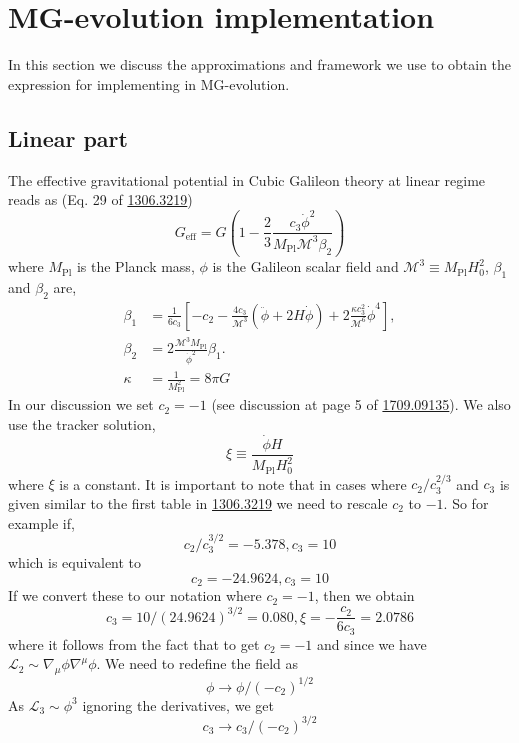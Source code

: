 \documentclass{article}
\def\be{\begin{equation}}
\def\ee{\end{equation}}
\begin{document}
\section{MG-evolution implementation}
In this section we discuss the approximations and framework we use to obtain the expression for implementing in MG-evolution.
\subsection{Linear part}
The effective gravitational potential in Cubic Galileon theory at linear regime reads as (Eq. 29 of \href{https://arxiv.org/abs/1306.3219}{1306.3219})
\be
G_{\mathrm{eff}}=G\left(1-\frac{2}{3} \frac{c_3 \dot{\phi}^2}{M_{\mathrm{Pl}} \mathcal{M}^3 \beta_2}\right)
\ee
where $M_{\mathrm{Pl}}$ is the Planck mass, $\phi$ is the Galileon scalar field and $\mathcal{M}^3 \equiv M_{\mathrm{Pl}} H_0^2$, $\beta_1$ and $\beta_2$ are,
\begin{align*}
\beta_1 &= \frac{1}{6 c_3}\left[-c_2 - \frac{4 c_3}{\mathcal{M}^3}(\ddot{\phi}+2 H \dot{\phi}) + 2 \frac{\kappa c_3^2}{\mathcal{M}^6} \dot{\phi}^4\right], \\
\beta_2 &= 2 \frac{\mathcal{M}^3 M_{\mathrm{Pl}}}{\dot{\phi}^2} \beta_1. \\
\kappa &= \frac{1}{M_{\mathrm{Pl}}^2} = 8 \pi G
\end{align*}
In our discussion we set $c_2 = -1$ (see discussion at page 5 of \href{https://arxiv.org/pdf/1709.09135.pdf}{1709.09135}). We also use the tracker solution,
\be
\xi \equiv \frac{\dot{\phi} H}{M_{\mathrm{Pl}} H_0^2}
\ee
where $\xi$ is a constant. It is important to note that in cases where $c_2/c_3^{2/3}$ and $c_3$ is given similar to the first table in \href{https://arxiv.org/abs/1306.3219}{1306.3219} we need to rescale $c_2$ to $-1$. So for example if,
\be
 c_2/c_3^{3/2} = -5.378 , c_3 = 10
\ee
which is equivalent to 
\be
 c_2= -24.9624 , c_3 = 10
\ee
If we convert these to our notation where $c_2 = -1$, then we obtain 
\be
c_3 = 10/(24.9624)^{3/2} = 0.080, \xi = -\frac{c_2}{6 c_3 } = 2.0786
\ee
where it follows from the fact that to get $c_2 = -1$ and since we have $\mathcal{L}_2 \sim \nabla_{\mu} \phi \nabla^{\mu} \phi$. We need to redefine the field as
\be
 \phi \to \phi/(-c_2)^{1/2}
 \ee
 As $\mathcal{L}_3 \sim \phi^3$ ignoring the derivatives, we get
 \be 
 c_3 \to c_3/(-c_2)^{3/2}
 \ee
\end{document}
